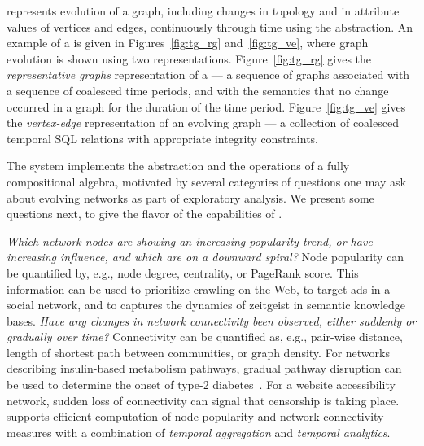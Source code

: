 \ql represents evolution of a graph, including changes in topology and
in attribute values of vertices and edges, continuously through time
using the \tg abstraction.  An example of a \tg is given in
Figures~\ref{fig:tg_rg} and~\ref{fig:tg_ve}, where graph evolution is
shown using two representations.  Figure~\ref{fig:tg_rg} gives the
{\em representative graphs} representation of a \tg --- a sequence of
graphs associated with a sequence of coalesced time periods, and with
the semantics that no change occurred in a graph for the duration of
the time period. Figure~\ref{fig:tg_ve} gives the {\em vertex-edge}
representation of an evolving graph --- a collection of coalesced
temporal SQL relations with appropriate integrity constraints.


The \ql system implements the \tg abstraction and the operations of a
fully compositional algebra, motivated by several categories of
questions one may ask about evolving networks as part of exploratory
analysis.  We present some  questions next, to give the
flavor of the capabilities of \ql.

{\em Which network nodes are showing an increasing popularity trend,
  or have increasing influence, and which are on a downward spiral?}
Node popularity can be quantified by, e.g., node degree, centrality,
or PageRank score.  This information can be used to prioritize
crawling on the Web, to target ads in a social network, and to
captures the dynamics of zeitgeist in semantic knowledge bases.
%
{\em Have any changes in network connectivity been observed, either
  suddenly or gradually over time?} Connectivity can be quantified as,
e.g., pair-wise distance, length of shortest path between communities,
or graph density.  For networks describing insulin-based metabolism
pathways, gradual pathway disruption can be used to determine the
onset of type-2 diabetes~\cite{DBLP:journals/tcsb/BeyerTLSF10}.  For a
website accessibility network, sudden loss of connectivity can signal
that censorship is taking place.
%
\ql supports efficient computation of node popularity and network
connectivity measures with a combination of {\em temporal aggregation}
and {\em temporal analytics}.

